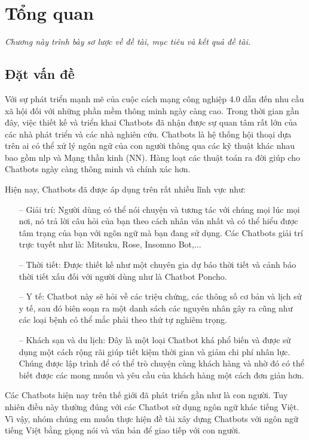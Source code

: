 \chapter{Tổng quan}
\label{Chapter1}

\emph{Chương này trình bày sơ lược về đề tài, mục tiêu và kết quả đề tài.}

\section{Đặt vấn đề}

Với sự phát triển mạnh mẽ của cuộc cách mạng công nghiệp 4.0 dẫn đến nhu cầu xã hội đối với những phần mềm thông minh ngày càng cao. Trong thời gian gần đây, việc thiết kế và triển khai Chatbots đã nhận được sự quan tâm rất lớn của các nhà phát triển và các nhà nghiên cứu. Chatbots là hệ thống hội thoại dựa trên \ac{ai} có thể xử lý ngôn ngữ của con người thông qua các kỹ thuật khác nhau bao gồm \ac{nlp} và Mạng thần kinh (NN). Hàng loạt các thuật toán ra đời giúp cho Chatbots ngày càng thông minh và chính xác hơn.

Hiện nay, Chatbots đã được áp dụng trên rất nhiều lĩnh vực như:
\begin{itemize}
    \item[--] Giải trí: Người dùng có thể nói chuyện và tương tác với chúng mọi lúc mọi nơi, nó trả lời câu hỏi của bạn theo cách nhân văn nhất và có thể hiểu được tâm trạng của bạn với ngôn ngữ mà bạn đang sử dụng. Các Chatbots giải trí trực tuyết như là: Mitsuku, Rose, Insomno Bot,...
    \item[--] Thời tiết: Được thiết kế như một chuyên gia dự báo thời tiết và cảnh báo thời tiết xấu đối với người dùng như là Chatbot Poncho.
    \item[--] Y tế: Chatbot này sẽ hỏi về các triệu chứng, các thông số cơ bản và lịch sử y tế, sau đó biên soạn ra một danh sách các nguyên nhân gây ra cũng như các loại bệnh có thể mắc phải theo thứ tự nghiêm trọng.
    \item[--] Khách sạn và du lịch: Đây là một loại Chatbot khá phổ biến và được sử dụng một cách rộng rãi giúp tiết kiệm thời gian và giảm chi phí nhân lực. Chúng được lập trình để có thể trò chuyện cùng khách hàng và nhờ đó có thể biết được các mong muốn và yêu cầu của khách hàng một cách đơn giản hơn.
\end{itemize}

Các Chatbots hiện nay trên thế giới đã phát triển gần như là con người. Tuy nhiên điều này thường đúng với các Chatbot sử dụng ngôn ngữ khác tiếng Việt. Vì vậy, nhóm chúng em muốn thực hiện đề tài xây dựng Chatbots với ngôn ngữ tiếng Việt bằng giọng nói và văn bản để giao tiếp với con người.

